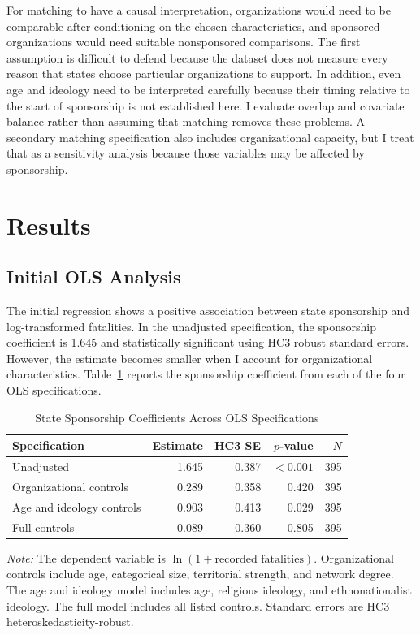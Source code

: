 \documentclass{article}
\begin{document}
For matching to have a causal interpretation, organizations would need to be comparable after conditioning on the chosen characteristics, and sponsored organizations would need suitable nonsponsored comparisons. The first assumption is difficult to defend because the dataset does not measure every reason that states choose particular organizations to support. In addition, even age and ideology need to be interpreted carefully because their timing relative to the start of sponsorship is not established here. I evaluate overlap and covariate balance rather than assuming that matching removes these problems. A secondary matching specification also includes organizational capacity, but I treat that as a sensitivity analysis because those variables may be affected by sponsorship.

\section{Results}

\subsection{Initial OLS Analysis}

The initial regression shows a positive association between state sponsorship and log-transformed fatalities. In the unadjusted specification, the sponsorship coefficient is 1.645 and statistically significant using HC3 robust standard errors. However, the estimate becomes smaller when I account for organizational characteristics. Table~\ref{tab:part3_ols} reports the sponsorship coefficient from each of the four OLS specifications.

\begin{table}[htbp]
\centering
\caption{State Sponsorship Coefficients Across OLS Specifications}
\label{tab:part3_ols}
\begin{tabular}{lrrrr}
\hline
Specification & Estimate & HC3 SE & $p$-value & $N$ \\
\hline
Unadjusted & 1.645 & 0.387 & $<0.001$ & 395 \\
Organizational controls & 0.289 & 0.358 & 0.420 & 395 \\
Age and ideology controls & 0.903 & 0.413 & 0.029 & 395 \\
Full controls & 0.089 & 0.360 & 0.805 & 395 \\
\hline
\end{tabular}
\par\smallskip
{\small\textit{Note:} The dependent variable is $\ln(1+\text{recorded fatalities})$. Organizational controls include age, categorical size, territorial strength, and network degree. The age and ideology model includes age, religious ideology, and ethnonationalist ideology. The full model includes all listed controls. Standard errors are HC3 heteroskedasticity-robust.}
\end{table}
\end{document}
